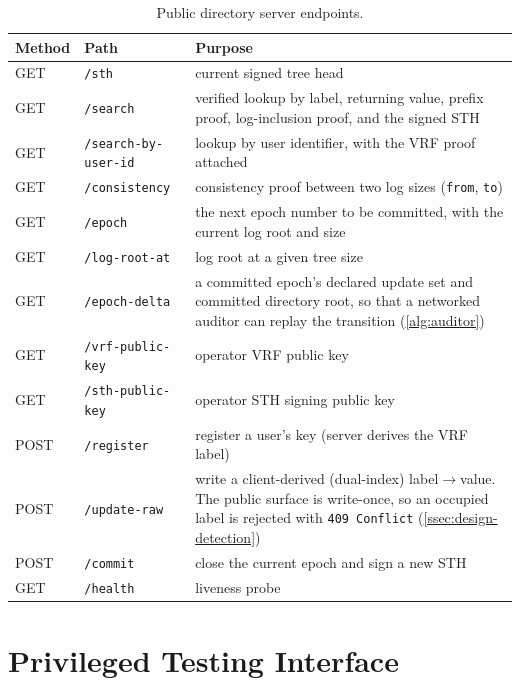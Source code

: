 \begin{table}[ht]
\centering
\caption{Public directory server endpoints.}
\label{tab:apiref-public}
\setlength{\extrarowheight}{2pt}
\footnotesize
\begin{tabular}{@{}lp{3.9cm}p{7.6cm}@{}}
\toprule
Method & Path & Purpose \\
\midrule
GET  & \texttt{/sth} & current signed tree head \\
GET  & \texttt{/search} & verified lookup by label, returning value, prefix proof, log-inclusion proof, and the signed STH \\
GET  & \texttt{/search-by-user-id} & lookup by user identifier, with the VRF proof attached \\
GET  & \texttt{/consistency} & consistency proof between two log sizes (\texttt{from}, \texttt{to}) \\
GET  & \texttt{/epoch} & the next epoch number to be committed, with the current log root and size \\
GET  & \texttt{/log-root-at} & log root at a given tree size \\
GET  & \texttt{/epoch-delta} & a committed epoch's declared update set and committed directory root, so that a networked auditor can replay the transition (\cref{alg:auditor}) \\
GET  & \texttt{/vrf-public-key} & operator VRF public key \\
GET  & \texttt{/sth-public-key} & operator STH signing public key \\
POST & \texttt{/register} & register a user's key (server derives the VRF label) \\
POST & \texttt{/update-raw} & write a client-derived (dual-index) label$\to$value. The public surface is write-once, so an occupied label is rejected with \texttt{409 Conflict} (\cref{ssec:design-detection}) \\
POST & \texttt{/commit} & close the current epoch and sign a new STH \\
GET  & \texttt{/health} & liveness probe \\
\bottomrule
\end{tabular}
\end{table}

\FloatBarrier
\section{Privileged Testing Interface}\label{sec:apiref-admin}

